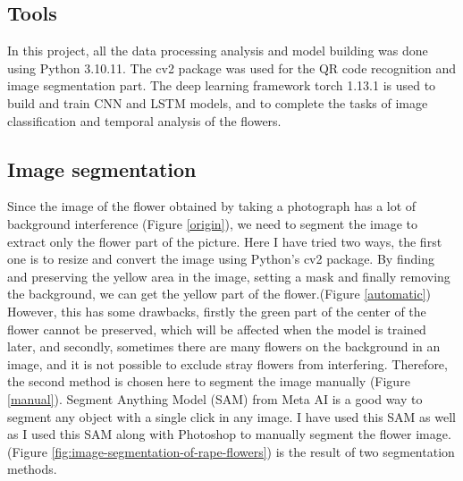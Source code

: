 \documentclass[11pt,a4paper]{article}
\begin{document}
\begin{spacing}{1.5}
\subsection{Tools}
In this project, all the data processing analysis and model building was done using Python 3.10.11.
The cv2 package was used for the QR code recognition and image segmentation part. The deep learning framework torch 1.13.1 is used to build and train CNN and LSTM models, and to complete the tasks of image classification and temporal analysis of the flowers.


\subsection{Image segmentation}
Since the image of the flower obtained by taking a photograph has a lot of background interference (Figure \ref{origin}), we need to segment the image to extract only the flower part of the picture.
Here I have tried two ways, the first one is to resize and convert the image using Python's cv2 package. By finding and preserving the yellow area in the image, setting a mask and finally removing the background, we can get the yellow part of the flower.(Figure \ref{automatic})
However, this has some drawbacks, firstly the green part of the center of the flower cannot be preserved, which will be affected when the model is trained later, and secondly, sometimes there are many flowers on the background in an image, and it is not possible to exclude stray flowers from interfering.
Therefore, the second method is chosen here to segment the image manually (Figure \ref{manual}). Segment Anything Model (SAM) \citet{kirillov2023segment} from Meta AI is a good way to segment any object with a single click in any image. I have used this SAM as well as I used this SAM along with Photoshop to manually segment the flower image.
(Figure \ref{fig:image-segmentation-of-rape-flowers}) is the result of two segmentation methods.


\end{spacing}
\end{document}

